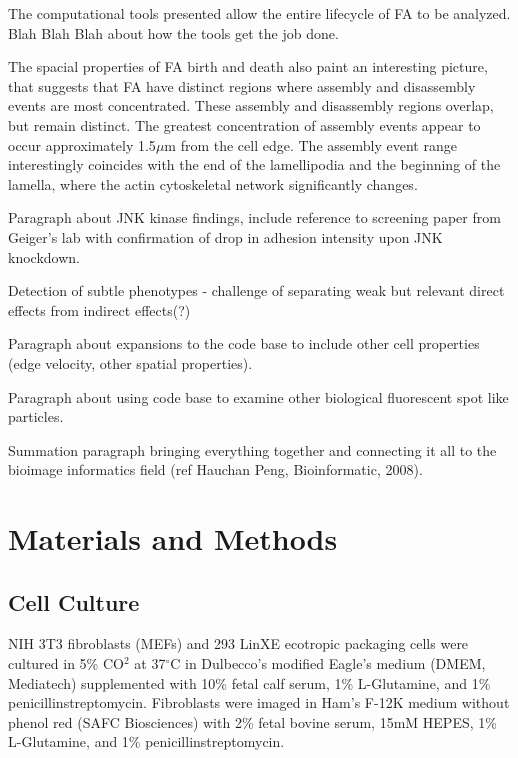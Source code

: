 \documentclass[10pt]{article}
\begin{document}
The computational tools presented allow the entire lifecycle of FA to be
analyzed. Blah Blah Blah about how the tools get the job done.

The spacial properties of FA birth and death also paint an interesting picture,
that suggests that FA have distinct regions where assembly and disassembly
events are most concentrated. These assembly and disassembly regions overlap,
but remain distinct. The greatest concentration of assembly events appear to
occur approximately 1.5$\mu$m from the cell edge. The assembly event range
interestingly coincides with the end of the lamellipodia and the beginning of
the lamella, where the actin cytoskeletal network significantly changes. 

Paragraph about JNK kinase findings, include reference to screening paper from
Geiger's lab with confirmation of drop in adhesion intensity upon JNK
knockdown.

Detection of subtle phenotypes - challenge of separating weak but relevant direct effects from indirect effects(?)

Paragraph about expansions to the code base to include other cell properties
(edge velocity, other spatial properties).

Paragraph about using code base to examine other biological fluorescent spot
like particles.

Summation paragraph bringing everything together and connecting it all to the
bioimage informatics field (ref Hauchan Peng, Bioinformatic, 2008). 



\section*{Materials and Methods}

\subsection*{Cell Culture}

NIH 3T3 fibroblasts (MEFs) and 293 LinXE ecotropic packaging cells were cultured
in 5\% CO$^2$ at 37$^\circ$C in Dulbecco's modified Eagle's medium (DMEM, Mediatech)
supplemented with 10\% fetal calf serum, 1\% L-Glutamine, and 1\%
penicillinstreptomycin. Fibroblasts were imaged in Ham's F-12K medium without
phenol red (SAFC Biosciences) with 2\% fetal bovine serum, 15mM HEPES, 1\%
L-Glutamine, and 1\% penicillinstreptomycin. 
\end{document}
